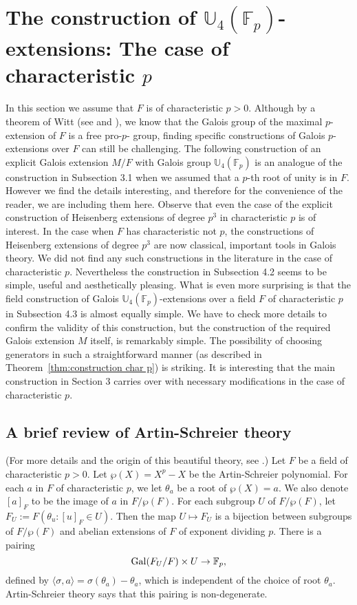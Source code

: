 \documentclass[12pt,leqno]{amsart}
\theoremstyle{plain}
\theoremstyle{definition}
\newcommand{\F}{{\mathbb F}}
\newcommand{\U}{{\mathbb U}}
\begin{document}
\section{The construction of $\U_4(\F_p)$-extensions: The case of characteristic $p$}
In this section we assume that $F$ is of characteristic $p>0$. Although by a theorem of Witt (see \cite{Wi} and \cite[Chapter 9, Section 9.1]{Ko}), we know that the Galois group of the maximal $p$-extension of $F$ is a free pro-$p$- group, finding specific constructions of Galois $p$-extensions over $F$ can still be challenging. The following construction of an explicit Galois extension $M/F$ with Galois group $\U_4(\F_p)$ is an analogue of the construction in Subsection 3.1 when we assumed that a $p$-th root of unity is in $F$. However we find the details interesting, and therefore for the convenience of the reader, we are including them here. Observe that even the case of the explicit construction of Heisenberg extensions of degree $p^3$ in characteristic $p$ is of interest. 
In the case  when $F$ has characteristic not $p$, the constructions of Heisenberg extensions of degree $p^3$ are now classical, important tools in Galois theory. We did not find any such constructions in the literature in the case of characteristic $p$. Nevertheless the construction in Subsection 4.2 seems to be simple, useful and aesthetically pleasing. What is even more surprising is that the field construction  of Galois $\U_4(\F_p)$-extensions over a field $F$ of characteristic $p$ in Subsection 4.3 is almost equally simple. We have to check more details to confirm the validity of this construction, but the construction of the required Galois extension $M$ itself, is remarkably simple.  
The possibility of choosing  generators in such a straightforward  manner (as described in Theorem~\ref{thm:construction char p}) is striking. It is interesting that the main construction in Section 3 carries over with necessary modifications in the case of characteristic $p$.
\subsection{A brief review of Artin-Schreier theory} (For more details and the origin of this beautiful theory, see \cite{ASch}.)
Let $F$ be a field of characteristic $p>0$. Let $\wp(X)=X^p-X$ be the Artin-Schreier polynomial. For each $a$ in  $F$ of characteristic $p$, we let $\theta_a$ be a root of $\wp(X)=a$. 
We also denote $[a]_F$ to be the image of $a$ in $F/\wp(F)$. 
For each subgroup $U$ of $F/\wp(F)$,  let $F_U:=F(\theta_u: [u]_F\in U)$. Then the map $U\mapsto F_U$ is a bijection between subgroups of $F/\wp(F)$ and abelian extensions of $F$ of  exponent dividing $p$. There is a pairing 
\[
{\rm Gal}(F_U/F) \times U\to \F_p,
\]
defined by $\langle \sigma, a\rangle = \sigma(\theta_a)-\theta_a$,  
which is independent of the choice of root $\theta_a$. Artin-Schreier theory says that this pairing is non-degenerate. 
\end{document}
